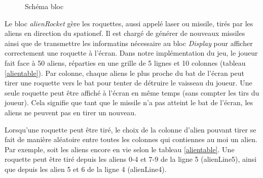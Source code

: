 \documentclass[french]{nakrule}
\begin{document}
\begin{figure}
\caption{Schéma bloc}
\label{alienRocketBloc}
\end{figure}

Le bloc \emph{alienRocket} gère les roquettes, aussi appelé laser ou missile, tirés par
les aliens en direction du spationef. Il est chargé de générer de nouveaux
missiles ainsi que de transmettre les informatins nécessaire au bloc \emph{Display} pour afficher
correctement une roquette à l'écran.
Dans notre implémentation du jeu, le joueur fait face à 50 aliens, réparties en
une grille de 5 lignes et 10 colonnes (tableau \ref{alientable}). Par colonne,
chaque aliens le plus proche du bat de l'écran peut tirer une roquette vers le
bat pour tenter de détruire le vaisseau du joueur. Une seule roquette peut être
affiché à l'écran en même temps (sans compter les tirs du joueur). Cela signifie
que tant que le missile n'a pas atteint le bat de l'écran, les aliens ne peuvent
pas en tirer un nouveau.

Lorsqu'une roquette peut être tiré, le choix de la colonne d'alien pouvant tirer
se fait de manière aléatoire entre toutes les colonnes qui contiennes au moi un
alien. Par exemple, soit les aliens encore en vie selon le tableau
\ref{alientable}. Une roquette peut être tiré depuis les aliens 0-4 et 7-9 de la
ligne 5 (alienLine5), ainsi que depuis les alien 5 et 6 de la ligne 4 (alienLine4).
\end{document}
